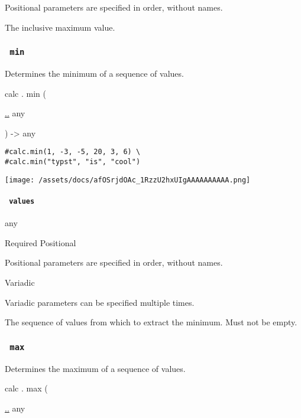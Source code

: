 \label{functions-clamp-max-positional-tooltip}
Positional parameters are specified in order, without names.

The inclusive maximum value.

\subsubsection{\texorpdfstring{\texttt{\ min\ }}{ min }}\label{functions-min}

Determines the minimum of a sequence of values.

calc { . } { min } (

{ \hyperref[functions-min-parameters-values]{..} { any } }

) -\textgreater{} { any }

\begin{verbatim}
#calc.min(1, -3, -5, 20, 3, 6) \
#calc.min("typst", "is", "cool")
\end{verbatim}

\texttt{[image: /assets/docs/afOSrjdOAc\_1RzzU2hxUIgAAAAAAAAAA.png]}

\paragraph{\texorpdfstring{\texttt{\ values\ }}{ values }}\label{functions-min-values}

{ any }

{Required} {{ Positional }}

\label{functions-min-values-positional-tooltip}
Positional parameters are specified in order, without names.

{{ Variadic }}

\label{functions-min-values-variadic-tooltip}
Variadic parameters can be specified multiple times.

The sequence of values from which to extract the minimum. Must not be
empty.

\subsubsection{\texorpdfstring{\texttt{\ max\ }}{ max }}\label{functions-max}

Determines the maximum of a sequence of values.

calc { . } { max } (

{ \hyperref[functions-max-parameters-values]{..} { any } }

